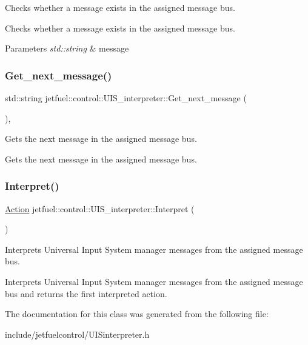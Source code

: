 Checks whether a message exists in the assigned message bus. 

Checks whether a message exists in the assigned message bus.


\begin{DoxyParams}{Parameters}
{\em std\+::string} & message \\
\hline
\end{DoxyParams}
\mbox{\label{classjetfuel_1_1control_1_1UIS__interpreter_ac385462d25e7be509fad46874dcb40e0}} 
\subsubsection{\texorpdfstring{Get\+\_\+next\+\_\+message()}{Get\_next\_message()}}
{\footnotesize\ttfamily std\+::string jetfuel\+::control\+::\+U\+I\+S\+\_\+interpreter\+::\+Get\+\_\+next\+\_\+message (\begin{DoxyParamCaption}{ }\end{DoxyParamCaption})\hspace{0.3cm}{\ttfamily [inline]}, {\ttfamily [protected]}}



Gets the next message in the assigned message bus. 

Gets the next message in the assigned message bus. \mbox{\label{classjetfuel_1_1control_1_1UIS__interpreter_ab298d59fded69955c059fb33e4ddb3ee}} 
\subsubsection{\texorpdfstring{Interpret()}{Interpret()}}
{\footnotesize\ttfamily \hyperlink{structjetfuel_1_1control_1_1Action}{Action} jetfuel\+::control\+::\+U\+I\+S\+\_\+interpreter\+::\+Interpret (\begin{DoxyParamCaption}{ }\end{DoxyParamCaption})}



Interprets Universal Input System manager messages from the assigned message bus. 

Interprets Universal Input System manager messages from the assigned message bus and returns the first interpreted action. 

The documentation for this class was generated from the following file\+:\begin{DoxyCompactItemize}
\item 
include/jetfuelcontrol/U\+I\+Sinterpreter.\+h\end{DoxyCompactItemize}
